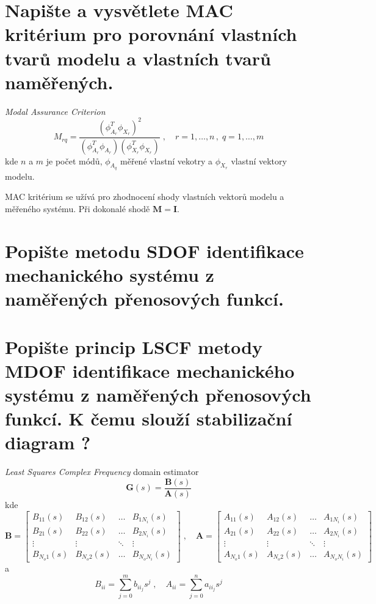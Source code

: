 \documentclass{article}
\begin{document}
	\section{Napište a vysvětlete MAC kritérium pro porovnání vlastních tvarů modelu a vlastních tvarů naměřených. }
	\emph{Modal Assurance Criterion}
	\begin{equation}
	M_{rq} = \frac{(\phi_{A_r}^T \phi_{X_r})^2}{(\phi_{A_r}^T\phi_{A_r})(\phi_{X_r}^T\phi_{X_r})}
	\;,\quad 
	r = 1,\dots,n \,,\; q = 1,\dots,m
	\end{equation}
	kde $n$ a $m$ je počet módů, $\phi_{A_q}$ měřené vlastní vekotry a $\phi_{X_r}$ vlastní vektory modelu.

	MAC kritérium se užívá pro zhodnocení shody vlastních vektorů modelu a měřeného systému. Při dokonalé shodě $\bm{M} = \bm{I}$.

	\section{Popište metodu SDOF identifikace mechanického systému z naměřených přenosových funkcí. }

	\section{Popište princip LSCF metody MDOF identifikace mechanického systému z naměřených přenosových funkcí. K čemu slouží stabilizační diagram ? }
	\emph{Least Squares Complex Frequency} domain estimator
	\begin{equation}
		\bm{G}(s) = \frac{\bm{B}(s)}{\bm{A}(s)}
	\end{equation}
	kde
	\begin{equation}
		\bm{B}
		=
		\begin{bmatrix}
			B_{11}(s) & B_{12}(s) & \dots & B_{1N_i}(s) \\
			B_{21}(s) & B_{22}(s) & \dots & B_{2N_i}(s) \\
			\vdots & \vdots & \ddots & \vdots \\
			B_{N_o 1}(s) & B_{N_o 2}(s) & \dots & B_{N_o N_i}(s)
		\end{bmatrix}
		\;,\quad 
		\bm{A}
		=
		\begin{bmatrix}
			A_{11}(s) & A_{12}(s) & \dots & A_{1N_i}(s) \\
			A_{21}(s) & A_{22}(s) & \dots & A_{2N_i}(s) \\
			\vdots & \vdots & \ddots & \vdots \\
			A_{N_o 1}(s) & A_{N_o 2}(s) & \dots & A_{N_o N_i}(s)
		\end{bmatrix}
	\end{equation}
	a
	\begin{equation}
	B_{ii} = \sum_{j=0}^m b_{{ii}_j} s^j
	\;,\quad 
	A_{ii} = \sum_{j=0}^n a_{{ii}_j} s^j
	\end{equation}
\end{document}
